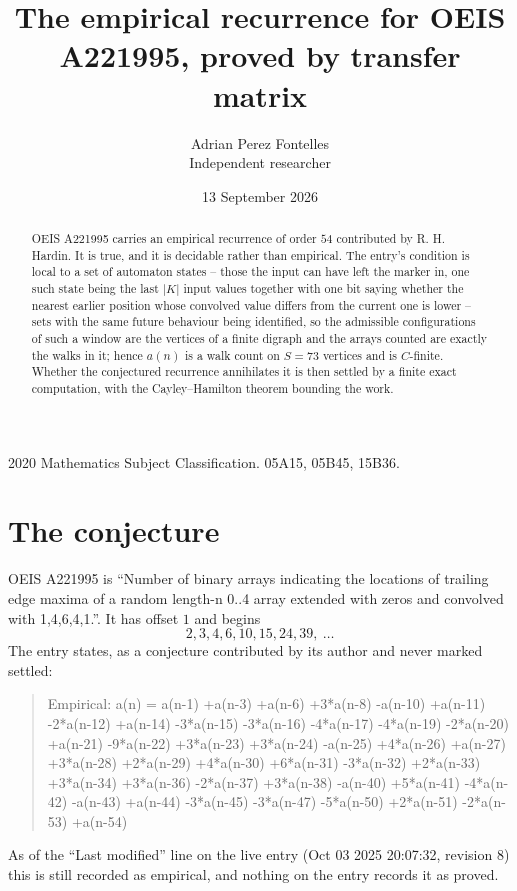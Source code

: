 \documentclass[11pt,a4paper]{article}
\title{The empirical recurrence for OEIS A221995, proved by transfer matrix}
\author{Adrian Perez Fontelles\\ \small Independent researcher}
\date{13 September 2026}
\theoremstyle{plain}
\theoremstyle{definition}
\begin{document}
\maketitle

\begin{abstract}
OEIS A221995 carries an empirical recurrence of order $54$ contributed by R. H. Hardin. It is
true, and it is decidable rather than empirical. The entry's condition is local to a set of automaton states -- those the input can have left the marker in, one such state being the last $|K|$ input values together with one bit saying whether the nearest earlier position whose convolved value differs from the current one is lower -- sets with the same future behaviour being identified, so
the admissible configurations of such a window are the vertices of a finite digraph and the
arrays counted are exactly the walks in it; hence $a(n)$ is a walk count on $S=73$ vertices
and is $C$-finite. Whether the conjectured recurrence annihilates it is then settled by a
finite exact computation, with the Cayley--Hamilton theorem bounding the work.
\end{abstract}

\noindent\small 2020 Mathematics Subject Classification. 05A15, 05B45, 15B36.\normalsize

\section{The conjecture}

OEIS A221995 is ``Number of binary arrays indicating the locations of trailing edge maxima of a random length-n 0..4 array extended with zeros and convolved with 1,4,6,4,1.''. It has offset $1$ and begins
\[
2, 3, 4, 6, 10, 15, 24, 39,\ \dots
\]
The entry states, as a conjecture contributed by its author and never marked settled:
\begin{quote}
Empirical: a(n) = a(n-1) +a(n-3) +a(n-6) +3*a(n-8) -a(n-10) +a(n-11) -2*a(n-12) +a(n-14) -3*a(n-15) -3*a(n-16) -4*a(n-17) -4*a(n-19) -2*a(n-20) +a(n-21) -9*a(n-22) +3*a(n-23) +3*a(n-24) -a(n-25) +4*a(n-26) +a(n-27) +3*a(n-28) +2*a(n-29) +4*a(n-30) +6*a(n-31) -3*a(n-32) +2*a(n-33) +3*a(n-34) +3*a(n-36) -2*a(n-37) +3*a(n-38) -a(n-40) +5*a(n-41) -4*a(n-42) -a(n-43) +a(n-44) -3*a(n-45) -3*a(n-47) -5*a(n-50) +2*a(n-51) -2*a(n-53) +a(n-54)
\end{quote}
As of the ``Last modified'' line on the live entry (Oct 03 2025 20:07:32, revision 8) this is still
recorded as empirical, and nothing on the entry records it as proved.
\end{document}
